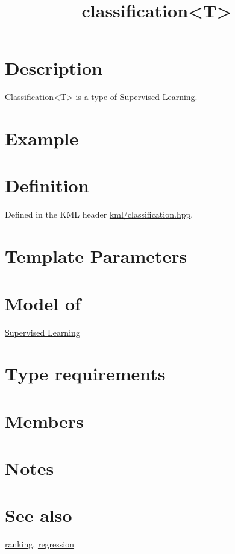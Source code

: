 \documentclass{article}
\begin{document}
\title{classification<T>}
\maketitle

\section*{Description}

Classification<T> is a type of \href{\kmlroot/reference/supervised_learning.html}{Supervised Learning}.

\section*{Example}
\section*{Definition}

Defined in the KML header \href{\kmlsvnroot/kml/classification.hpp}{kml/classification.hpp}.

\section*{Template Parameters}
\section*{Model of}

\href{\kmlroot/reference/supervised_learning.html}{Supervised Learning}

\section*{Type requirements}
\section*{Members}
\section*{Notes}
\section*{See also}

\href{\kmlroot/reference/ranking.html}{ranking},
\href{\kmlroot/reference/regression.html}{regression}



\end{document}
